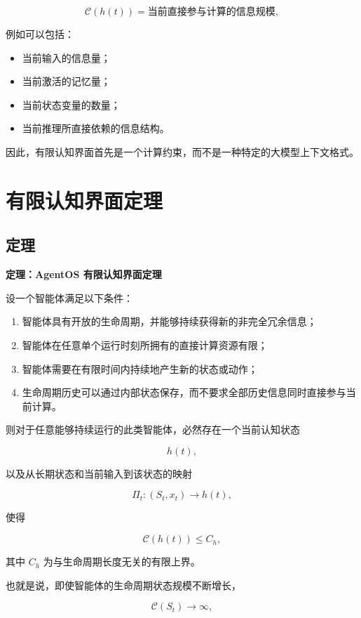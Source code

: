 \[
\mathcal{C}(h(t))
=
\text{当前直接参与计算的信息规模},
\]

例如可以包括：

\begin{itemize}
    \item 当前输入的信息量；
    \item 当前激活的记忆量；
    \item 当前状态变量的数量；
    \item 当前推理所直接依赖的信息结构。
\end{itemize}

因此，有限认知界面首先是一个计算约束，而不是一种特定的大模型上下文格式。


\section{有限认知界面定理}

\subsection{定理}

\textbf{定理：AgentOS 有限认知界面定理}

设一个智能体满足以下条件：

\begin{enumerate}
    \item 智能体具有开放的生命周期，并能够持续获得新的非完全冗余信息；
    \item 智能体在任意单个运行时刻所拥有的直接计算资源有限；
    \item 智能体需要在有限时间内持续地产生新的状态或动作；
    \item 生命周期历史可以通过内部状态保存，而不要求全部历史信息同时直接参与当前计算。
\end{enumerate}

则对于任意能够持续运行的此类智能体，必然存在一个当前认知状态

\[
h(t),
\]

以及从长期状态和当前输入到该状态的映射

\[
\Pi_t:
(S_t,x_t)
\rightarrow
h(t),
\]

使得

\[
\mathcal{C}(h(t))
\leq
C_h,
\]

其中 $C_h$ 为与生命周期长度无关的有限上界。

也就是说，即使智能体的生命周期状态规模不断增长，

\[
\mathcal{C}(S_t)
\rightarrow
\infty,
\]

